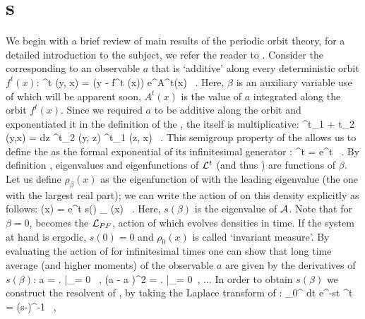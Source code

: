 \section{\CycForm s}
\label{s:DynAvers}

We begin with a brief review of main results of the periodic
orbit theory, for a detailed introduction to the subject, we refer the reader to
. Consider the {\evOper} corresponding to an observable
$a$ that is `additive' along every deterministic orbit $f^t(x)$:
\beq
	\Lop^t (y, x) = \delta (y - f^t (x)) e^{\beta A^t(x)} \, .
	\label{eq-EvOp}
\eeq
Here, $\beta$ is an auxiliary variable use of which will be apparent soon,
$A^t (x)$ is the value of $a$ integrated along the orbit $f^t(x)$.
Since we required $a$ to be additive along the orbit and exponentiated
it in the definition of the {\evOper} , the
{\evOper} itself is multiplicative:
\beq
	\Lop^{t_1 + t_2} (y,x) = \int dz \Lop^{t_2} (y, z) \Lop^{t_1} (z, x) \, .
	\label{eq-SemiGroup}
\eeq
This semigroup property of the {\evOper} allows us to define
the {\evOper} as the formal exponential of its infinitesimal
generator \Aop :
\beq
	\Lop^t = e^{\Aop t} \, .
	\label{eq-EvOpExp}
\eeq
By definition , eigenvalues and eigenfunctions of ${\cal L}^t$ (and
thus \Aop ) are functions of $\beta$. Let us define $\rho_{\beta} (x)$ as the
eigenfunction of  with the leading eigenvalue (the one with the
largest real part); we can write the action of  on this density
explicitly as follows:
\beq
     (x) = e^{t s(\beta )} \rho_{\beta} (x) \, .
    \label{eq-EigenvalueRel}
\eeq
Here, $s(\beta)$ is the eigenvalue of ${\cal A}$. Note that for $\beta = 0$,
 becomes the {\FPoper} ${\cal L}_{PF}$,
action of which evolves densities in time. If the system at hand is ergodic,
$s(0) = 0$ and $\rho_0 (x)$ is called `invariant measure'. By evaluating the action
of  for infinitesimal times one can show that long time average
(and higher moments) of the observable $a$ are given by the derivatives of $s(\beta)$:
\beq
    \langle a \rangle = \left.  \right|_{\beta = 0} \, , \quad
    \langle (a - \langle a \rangle )^2 \rangle = \left. 
                                                     \right|_{\beta = 0} \,, ...
    \label{eq-moments}
\eeq
In order to obtain $s(\beta)$ we construct the resolvent of \Aop , by taking the
Laplace transform of :
\beq
	\int_0^{\infty} dt e^{-st} \Lop^t = (s-\Aop)^{-1} \, ,
	\label{eq-ResoolventA}
